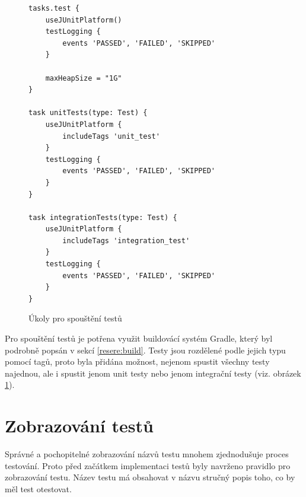     \begin{figure}
        \begin{verbatim}
tasks.test {
    useJUnitPlatform()
    testLogging {
        events 'PASSED', 'FAILED', 'SKIPPED'
    }

    maxHeapSize = "1G"
}

task unitTests(type: Test) {
    useJUnitPlatform {
        includeTags 'unit_test'
    }
    testLogging {
        events 'PASSED', 'FAILED', 'SKIPPED'
    }
}

task integrationTests(type: Test) {
    useJUnitPlatform {
        includeTags 'integration_test'
    }
    testLogging {
        events 'PASSED', 'FAILED', 'SKIPPED'
    }
}
        \end{verbatim}
        \caption{Úkoly pro spouštění testů} 
        \label{code:gradle-tests}
    \end{figure}
    Pro spouštění testů je potřena využit buildovácí systém Gradle, který byl podrobně popsán v sekcí \ref{resere:build}. Testy jsou rozdělené podle jejich typu pomocí tagů, proto byla přidána možnost, nejenom spustit všechny testy najednou, ale i spustit jenom unit testy nebo jenom integrační testy (viz. obrázek \ref{code:gradle-tests}).
\section{Zobrazování testů}\label{testovani:zobrazovani}
    Správné a pochopitelné zobrazování názvů testu mnohem zjednodušuje proces testování. Proto před začátkem implementaci testů byly navrženo pravidlo pro zobrazování testu. Název testu má obsahovat v názvu stručný popis toho, co by měl test otestovat. 
    
